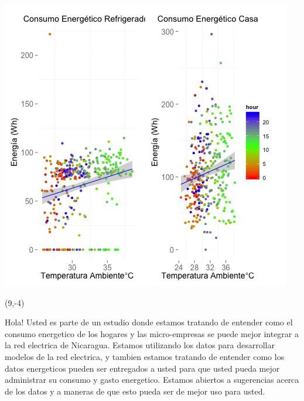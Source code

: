 \documentclass{article}\usepackage[]{graphicx}\usepackage[]{color}
\newenvironment{knitrout}{}{} %
\begin{document}
\begin{knitrout}
\color{fgcolor}
\includegraphics[scale=0.75]{figure/A5_correlaciones} 
\end{knitrout}

 \begin{textblock}{1}(9,-4)
\begin{minipage}{20em}
\begingroup

\endgroup
\end{minipage}
\end{textblock}

\vspace{70px}
\begin{knitrout}
Hola! Usted es parte de un estudio donde estamos tratando de entender como el consumo energetico de los hogares y las micro-empresas se puede mejor integrar a la red electrica de Nicaragua. Estamos utilizando los datos para desarrollar modelos de la red electrica, y tambien estamos tratando de entender como los datos energeticos pueden ser entregados a usted para que usted pueda mejor administrar su consumo y gasto energetico.  Estamos abiertos a sugerencias acerca de los datos y a maneras de que esto pueda ser de mejor uso para usted.
\end{knitrout}
\end{document}
